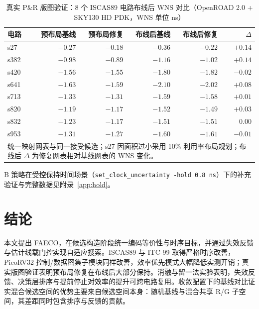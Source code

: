 \documentclass[journal]{IEEEtran}
\begin{document}
\begin{table}[!t]
\centering
\caption{真实 P\&R 版图验证：8 个 ISCAS89 电路布线后 WNS 对比（OpenROAD 2.0 + SKY130 HD PDK，WNS 单位 ns）}
\label{tab:pr8}
\footnotesize
\setlength{\tabcolsep}{2.5pt}
\begin{tabular}{lrrrrr}
\toprule
\textbf{电路} & \textbf{预布局基线} & \textbf{预布局修复} & \textbf{布线后基线} & \textbf{布线后修复} & $\Delta$ \\
\midrule
s27  & $-0.27$ & $-0.18$ & $-0.36$ & $-0.22$ & $+0.14$ \\
s382 & $-0.98$ & $-0.89$ & $-1.16$ & $-1.02$ & $+0.14$ \\
s420 & $-1.56$ & $-1.55$ & $-1.80$ & $-1.82$ & $-0.02$ \\
s641 & $-1.63$ & $-1.59$ & $-2.10$ & $-2.02$ & $+0.08$ \\
s713 & $-1.33$ & $-1.31$ & $-1.59$ & $-1.58$ & $+0.01$ \\
s820 & $-1.19$ & $-1.17$ & $-1.52$ & $-1.49$ & $+0.03$ \\
s832 & $-1.23$ & $-1.17$ & $-1.51$ & $-1.51$ & $0.00$ \\
s953 & $-1.31$ & $-1.27$ & $-1.60$ & $-1.61$ & $-0.01$ \\
\bottomrule
\multicolumn{6}{p{0.92\columnwidth}}{\footnotesize 统一映射网表与同一接受候选；s27 因面积过小采用 10\% 利用率布局规划；布线后 $\Delta$ 为修复网表相对基线网表的 WNS 变化。}\\
\end{tabular}
\end{table}





B 策略在受控保持时间场景（\texttt{set\_clock\_uncertainty -hold 0.8\,ns}）下的补充验证与完整数据见附录~\ref{app:hold}。

\section{结论}\label{sec:conclusion}

本文提出 FAECO，在候选构造阶段统一编码等价性与时序目标，并通过失效反馈与估计线载门控实现自适应搜索。ISCAS89 与 ITC-99 取得严格时序改善，PicoRV32 控制/数据密集子模块同样改善，效率优先模式大幅降低实测开销；真实版图验证表明预布局修复在布线后大部分保持。消融与留一法实验表明，失效反馈、决策层排序与提前停止对效率的提升可跨电路复用。收敛配置下的基线对比证实混合候选空间的优势主要来自候选空间本身：随机基线与混合共享 R/G 子空间，其差距同时包含排序与反馈的贡献。
\end{document}
